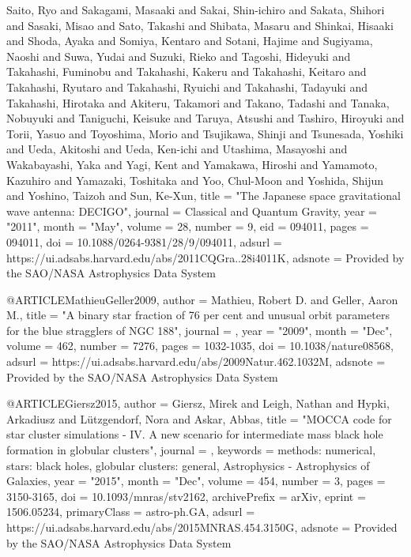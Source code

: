 \documentclass[twocolumn,tighten]{aastex63}
\begin{document}
{{         {Saito}, Ryo and {Sakagami}, Masaaki and {Sakai}, Shin-ichiro and
         {Sakata}, Shihori and {Sasaki}, Misao and {Sato}, Takashi and
         {Shibata}, Masaru and {Shinkai}, Hisaaki and {Shoda}, Ayaka and
         {Somiya}, Kentaro and {Sotani}, Hajime and {Sugiyama}, Naoshi and
         {Suwa}, Yudai and {Suzuki}, Rieko and {Tagoshi}, Hideyuki and
         {Takahashi}, Fuminobu and {Takahashi}, Kakeru and {Takahashi}, Keitaro and
         {Takahashi}, Ryutaro and {Takahashi}, Ryuichi and
         {Takahashi}, Tadayuki and {Takahashi}, Hirotaka and
         {Akiteru}, Takamori and {Takano}, Tadashi and {Tanaka}, Nobuyuki and
         {Taniguchi}, Keisuke and {Taruya}, Atsushi and {Tashiro}, Hiroyuki and
         {Torii}, Yasuo and {Toyoshima}, Morio and {Tsujikawa}, Shinji and
         {Tsunesada}, Yoshiki and {Ueda}, Akitoshi and {Ueda}, Ken-ichi and
         {Utashima}, Masayoshi and {Wakabayashi}, Yaka and {Yagi}, Kent and
         {Yamakawa}, Hiroshi and {Yamamoto}, Kazuhiro and {Yamazaki}, Toshitaka and
         {Yoo}, Chul-Moon and {Yoshida}, Shijun and {Yoshino}, Taizoh and
         {Sun}, Ke-Xun},
        title = "{The Japanese space gravitational wave antenna: DECIGO}",
      journal = {Classical and Quantum Gravity},
         year = "2011",
        month = "May",
       volume = {28},
       number = {9},
          eid = {094011},
        pages = {094011},
          doi = {10.1088/0264-9381/28/9/094011},
       adsurl = {https://ui.adsabs.harvard.edu/abs/2011CQGra..28i4011K},
      adsnote = {Provided by the SAO/NASA Astrophysics Data System}
}

@ARTICLE{MathieuGeller2009,
       author = {{Mathieu}, Robert D. and {Geller}, Aaron M.},
        title = "{A binary star fraction of 76 per cent and unusual orbit parameters for the blue stragglers of NGC 188}",
      journal = {\nat},
         year = "2009",
        month = "Dec",
       volume = {462},
       number = {7276},
        pages = {1032-1035},
          doi = {10.1038/nature08568},
       adsurl = {https://ui.adsabs.harvard.edu/abs/2009Natur.462.1032M},
      adsnote = {Provided by the SAO/NASA Astrophysics Data System}
}

@ARTICLE{Giersz2015,
       author = {{Giersz}, Mirek and {Leigh}, Nathan and {Hypki}, Arkadiusz and
         {L{\"u}tzgendorf}, Nora and {Askar}, Abbas},
        title = "{MOCCA code for star cluster simulations - IV. A new scenario for intermediate mass black hole formation in globular clusters}",
      journal = {\mnras},
     keywords = {methods: numerical, stars: black holes, globular clusters: general, Astrophysics - Astrophysics of Galaxies},
         year = "2015",
        month = "Dec",
       volume = {454},
       number = {3},
        pages = {3150-3165},
          doi = {10.1093/mnras/stv2162},
archivePrefix = {arXiv},
       eprint = {1506.05234},
 primaryClass = {astro-ph.GA},
       adsurl = {https://ui.adsabs.harvard.edu/abs/2015MNRAS.454.3150G},
      adsnote = {Provided by the SAO/NASA Astrophysics Data System}
}
\end{document}
